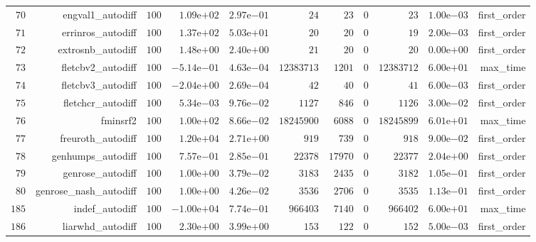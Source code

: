 \documentclass[varwidth=20cm,crop=true]{standalone}
\begin{document}
\begin{longtable}{rrrrrrrrrrr}
  \(    70\) & engval1\_autodiff & \(   100\) & \( 1.09\)e\(+02\) & \( 2.97\)e\(-01\) & \(    24\) & \(    23\) & \(     0\) & \(    23\) & \( 1.00\)e\(-03\) & first\_order \\
  \(    71\) & errinros\_autodiff & \(   100\) & \( 1.37\)e\(+02\) & \( 5.03\)e\(+01\) & \(    20\) & \(    20\) & \(     0\) & \(    19\) & \( 2.00\)e\(-03\) & first\_order \\
  \(    72\) & extrosnb\_autodiff & \(   100\) & \( 1.48\)e\(+00\) & \( 2.40\)e\(+00\) & \(    21\) & \(    20\) & \(     0\) & \(    20\) & \( 0.00\)e\(+00\) & first\_order \\
  \(    73\) & fletcbv2\_autodiff & \(   100\) & \(-5.14\)e\(-01\) & \( 4.63\)e\(-04\) & \(12383713\) & \(  1201\) & \(     0\) & \(12383712\) & \( 6.00\)e\(+01\) & max\_time \\
  \(    74\) & fletcbv3\_autodiff & \(   100\) & \(-2.04\)e\(+00\) & \( 2.69\)e\(-04\) & \(    42\) & \(    40\) & \(     0\) & \(    41\) & \( 6.00\)e\(-03\) & first\_order \\
  \(    75\) & fletchcr\_autodiff & \(   100\) & \( 5.34\)e\(-03\) & \( 9.76\)e\(-02\) & \(  1127\) & \(   846\) & \(     0\) & \(  1126\) & \( 3.00\)e\(-02\) & first\_order \\
  \(    76\) & fminsrf2 & \(   100\) & \( 1.00\)e\(+02\) & \( 8.66\)e\(-02\) & \(18245900\) & \(  6088\) & \(     0\) & \(18245899\) & \( 6.01\)e\(+01\) & max\_time \\
  \(    77\) & freuroth\_autodiff & \(   100\) & \( 1.20\)e\(+04\) & \( 2.71\)e\(+00\) & \(   919\) & \(   739\) & \(     0\) & \(   918\) & \( 9.00\)e\(-02\) & first\_order \\
  \(    78\) & genhumps\_autodiff & \(   100\) & \( 7.57\)e\(-01\) & \( 2.85\)e\(-01\) & \( 22378\) & \( 17970\) & \(     0\) & \( 22377\) & \( 2.04\)e\(+00\) & first\_order \\
  \(    79\) & genrose\_autodiff & \(   100\) & \( 1.00\)e\(+00\) & \( 3.79\)e\(-02\) & \(  3183\) & \(  2435\) & \(     0\) & \(  3182\) & \( 1.05\)e\(-01\) & first\_order \\
  \(    80\) & genrose\_nash\_autodiff & \(   100\) & \( 1.00\)e\(+00\) & \( 4.26\)e\(-02\) & \(  3536\) & \(  2706\) & \(     0\) & \(  3535\) & \( 1.13\)e\(-01\) & first\_order \\
  \(   185\) & indef\_autodiff & \(   100\) & \(-1.00\)e\(+04\) & \( 7.74\)e\(-01\) & \(966403\) & \(  7140\) & \(     0\) & \(966402\) & \( 6.00\)e\(+01\) & max\_time \\
  \(   186\) & liarwhd\_autodiff & \(   100\) & \( 2.30\)e\(+00\) & \( 3.99\)e\(+00\) & \(   153\) & \(   122\) & \(     0\) & \(   152\) & \( 5.00\)e\(-03\) & first\_order \\

\end{longtable}
\end{document}
